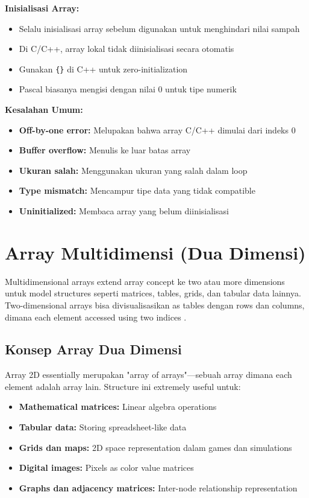 \documentclass[../main.tex]{subfiles}
\begin{document}
\textbf{Inisialisasi Array:}
\begin{itemize}
  \item Selalu inisialisasi array sebelum digunakan untuk menghindari nilai sampah
  \item Di C/C++, array lokal tidak diinisialisasi secara otomatis
  \item Gunakan \texttt{\{\}} di C++ untuk zero-initialization
  \item Pascal biasanya mengisi dengan nilai 0 untuk tipe numerik
\end{itemize}

\textbf{Kesalahan Umum:}
\begin{itemize}
  \item \textbf{Off-by-one error:} Melupakan bahwa array C/C++ dimulai dari indeks 0
  \item \textbf{Buffer overflow:} Menulis ke luar batas array
  \item \textbf{Ukuran salah:} Menggunakan ukuran yang salah dalam loop
  \item \textbf{Type mismatch:} Mencampur tipe data yang tidak compatible
  \item \textbf{Uninitialized:} Membaca array yang belum diinisialisasi
\end{itemize}

\section{Array Multidimensi (Dua Dimensi)}

Multidimensional arrays extend array concept ke two atau more dimensions untuk model structures seperti matrices, tables, grids, dan tabular data lainnya. Two-dimensional arrays bisa divisualisasikan as tables dengan rows dan columns, dimana each element accessed using two indices \parencite{iso-c-draft-n1570,cpp-reference,tutorialspoint-2d-arrays,duniailkom-cpp-2d-array}.

\subsection{Konsep Array Dua Dimensi}

Array 2D essentially merupakan "array of arrays"—sebuah array dimana each element adalah array lain. Structure ini extremely useful untuk:
\begin{itemize}
  \item \textbf{Mathematical matrices:} Linear algebra operations
  \item \textbf{Tabular data:} Storing spreadsheet-like data
  \item \textbf{Grids dan maps:} 2D space representation dalam games dan simulations
  \item \textbf{Digital images:} Pixels as color value matrices
  \item \textbf{Graphs dan adjacency matrices:} Inter-node relationship representation
\end{itemize}
\end{document}
